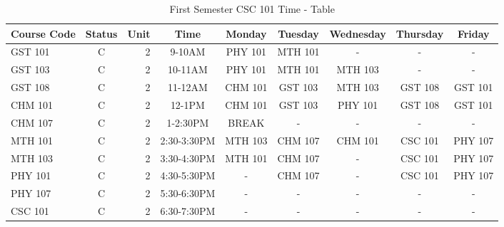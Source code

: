\documentclass{article}
\begin{document}
 \begin{sidewaystable}[h!]
	\begin{center}
		\caption{First Semester CSC 101 Time - Table}
		\label{tab:table1}
		\begin{tabular}{|l|c|r|c|c|c|c|c|c|}
			\cellcolor{blue!25}\textbf{Course Code} & \cellcolor{blue!25}\textbf{Status} & \cellcolor{blue!25}\textbf{Unit} & \cellcolor{blue!25}\textbf{Time} &  \cellcolor{green!25}\textbf{Monday} &  \cellcolor{green!25}\textbf{Tuesday} & \cellcolor{green!25}\textbf{Wednesday} &  \cellcolor{green!25}\textbf{Thursday} &
			\cellcolor{green!25}\textbf{Friday}\\
			\hline
			\cellcolor{red!25}GST 101 & C & 2 & 9-10AM & PHY 101 & MTH 101 & - & - & - \\
			\cellcolor{red!25}GST 103 & C & 2 & 10-11AM & PHY 101 & MTH 101 & MTH 103 & - & - \\
			\cellcolor{red!25}GST 108 & C & 2 & 11-12AM & CHM 101 & GST 103 & MTH 103 & GST 108 & GST 101 \\
			\cellcolor{red!25}CHM 101 & C & 2 & 12-1PM & CHM 101 & GST 103 & PHY 101 & GST 108 & GST 101\\
			\cellcolor{red!25}CHM 107 & C & 2 & 1-2:30PM & \cellcolor{black!10}BREAK & \cellcolor{black!10}- & \cellcolor{black!10}- & \cellcolor{black!10}- & \cellcolor{black!10}-\\
			\cellcolor{red!25}MTH 101 & C & 2 & 2:30-3:30PM & MTH 103 & CHM 107 & CHM 101 & CSC 101 & PHY 107\\
			\cellcolor{red!25}MTH 103 & C & 2 & 3:30-4:30PM & MTH 101 & CHM 107 & - & CSC 101 & PHY 107 \\
			\cellcolor{red!25}PHY 101 & C & 2 & 4:30-5:30PM & - & CHM 107 & - & CSC 101 & PHY 107\\
		    \cellcolor{red!25}PHY 107 & C & 2 & 5:30-6:30PM & - & - & - & - & -\\
			\cellcolor{red!25}CSC 101 & C & 2 & 6:30-7:30PM & - & - & - & - & -\\
			\hline
		\end{tabular}
	\end{center}
 \end{sidewaystable}
\end{document}
